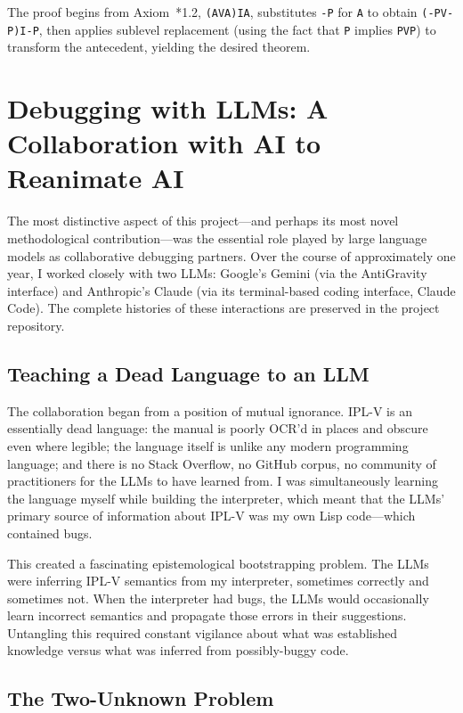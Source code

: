 \documentclass[journal]{IEEEtran}
\begin{document}
The proof begins from Axiom~*1.2, \texttt{(AVA)IA}, substitutes
\texttt{-P} for \texttt{A} to obtain \texttt{(-PV-P)I-P}, then
applies sublevel replacement (using the fact that \texttt{P} implies
\texttt{PVP}) to transform the antecedent, yielding the desired
theorem.

\section{Debugging with LLMs: A Collaboration with AI to Reanimate AI}
\label{sec:debugging}

The most distinctive aspect of this project---and perhaps its most
novel methodological contribution---was the essential role played by
large language models as collaborative debugging partners. Over the
course of approximately one year, I worked closely with two LLMs:
Google's Gemini (via the AntiGravity interface) and Anthropic's Claude
(via its terminal-based coding interface, Claude Code). The complete
histories of these interactions are preserved in the project
repository.

\subsection{Teaching a Dead Language to an LLM}

The collaboration began from a position of mutual ignorance. IPL-V is
an essentially dead language: the manual is poorly OCR'd in places and
obscure even where legible; the language itself is unlike any modern
programming language; and there is no Stack Overflow, no GitHub
corpus, no community of practitioners for the LLMs to have learned
from. I was simultaneously learning the language myself while building
the interpreter, which meant that the LLMs' primary source of
information about IPL-V was my own Lisp code---which contained bugs.

This created a fascinating epistemological bootstrapping problem. The
LLMs were inferring IPL-V semantics from my interpreter, sometimes
correctly and sometimes not. When the interpreter had bugs, the LLMs
would occasionally learn incorrect semantics and propagate those
errors in their suggestions. Untangling this required constant
vigilance about what was established knowledge versus what was
inferred from possibly-buggy code.

\subsection{The Two-Unknown Problem}
\end{document}
